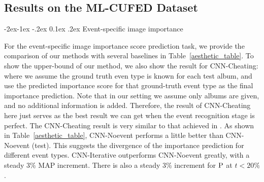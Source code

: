 \documentclass[runningheads]{llncs}
\makeatletter
\renewcommand\subsubsection{\@startsection{subsubsection}{3}{\z@}%
                {-2ex\@plus -1ex \@minus -.2ex}%
                {0.1ex \@plus .2ex}%
                {\normalfont\normalsize\bfseries}}
\makeatother
\begin{document}
\subsection{Results on the ML-CUFED Dataset}
\subsubsection{Event-specific image importance}

For the event-specific image importance score prediction task, we provide the comparison of our methods with several baselines in Table~\ref{aesthetic_table}. To show the upper-bound of our method, we also show the result for CNN-Cheating: where we assume the ground truth even type is known for each test album,  and use the predicted importance score for that ground-truth event type as the final importance prediction. Note that in our setting we assume only albums are given, and no additional information is added. Therefore, the result of CNN-Cheating here just serves as the best result we can get when the event recognition stage is perfect. The CNN-Cheating result is very similar to that achieved in \cite{CVPR}. As shown in Table~\ref{aesthetic_table}, CNN-Noevent performs a little better than CNN-Noevent (test). This suggests the divergence of the importance prediction for different event types. CNN-Iterative outperforms CNN-Noevent greatly, with a steady 3\% MAP increment. There is also a steady 3\% increment for $\textup{P}$ at $t<20\%$.
\end{document}
